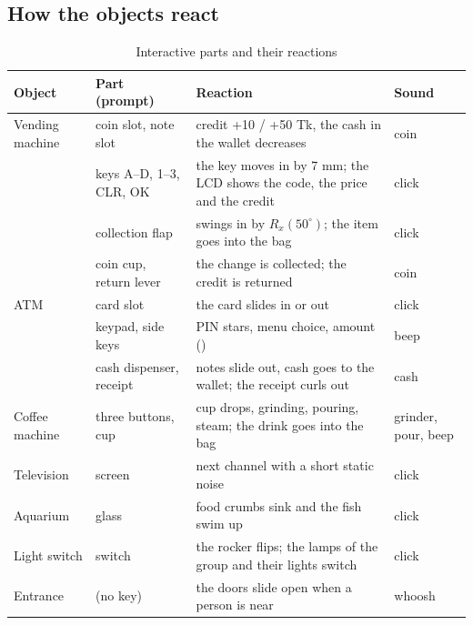 \subsection{How the objects react}
\begin{table}[H]
\centering\small
\caption{Interactive parts and their reactions}\label{tab:reactions}
\begin{tabularx}{\linewidth}{@{}P{2.4cm}P{3.6cm}X P{2.0cm}@{}}
\toprule
Object & Part (prompt) & Reaction & Sound \\ \midrule
Vending machine & coin slot, note slot & credit +10 / +50 Tk, the cash in the wallet decreases & coin \\
 & keys A--D, 1--3, CLR, OK & the key moves in by 7 mm; the LCD shows the code, the price and the credit & click \\
 & collection flap & swings in by $R_x(50^\circ)$; the item goes into the bag & click \\
 & coin cup, return lever & the change is collected; the credit is returned & coin \\
ATM & card slot & the card slides in or out & click \\
 & keypad, side keys & PIN stars, menu choice, amount () & beep \\
 & cash dispenser, receipt & notes slide out, cash goes to the wallet; the receipt curls out & cash \\
Coffee machine & three buttons, cup & cup drops, grinding, pouring, steam; the drink goes into the bag & grinder, pour, beep \\
Television & screen & next channel with a short static noise & click \\
Aquarium & glass & food crumbs sink and the fish swim up & click \\
Light switch & switch & the rocker flips; the lamps of the group and their lights switch & click \\
Entrance & (no key) & the doors slide open when a person is near & whoosh \\
\bottomrule
\end{tabularx}
\end{table}

